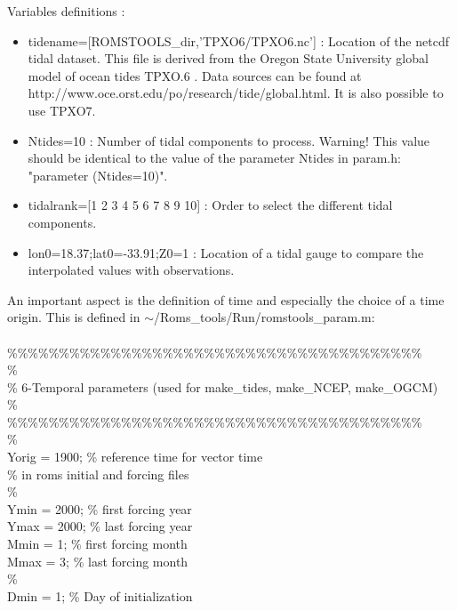 Variables definitions :
\begin{itemize}
\item tidename=[ROMSTOOLS\_dir,'TPXO6/TPXO6.nc'] : Location of the netcdf tidal dataset. 
This file is derived from the Oregon State University global model of ocean tides TPXO.6 
\citep{Egb02}.  Data sources can be found at \\
http://www.oce.orst.edu/po/research/tide/global.html.
It is also possible to use TPXO7.
\item Ntides=10 : Number of tidal components to process. Warning!
This value should be identical to the value of the parameter Ntides in param.h:
"parameter (Ntides=10)".
\item tidalrank=[1 2 3 4 5 6 7 8 9 10] : Order to select the different tidal components.
\item lon0=18.37;lat0=-33.91;Z0=1 : Location of a tidal gauge to compare the interpolated values
with observations. \\
\end{itemize}
An important aspect is the definition of time and especially the choice of a 
time origin. This is defined in $\sim$/Roms\_tools/Run/romstools\_param.m:
\\
\\
\%\%\%\%\%\%\%\%\%\%\%\%\%\%\%\%\%\%\%\%\%\%\%\%\%\%\%\%\%\%\%\%\%\%\%\%\%\%\%\%\\
\%\\
\% 6-Temporal parameters (used for make\_tides, make\_NCEP, make\_OGCM)\\
\%\\
\%\%\%\%\%\%\%\%\%\%\%\%\%\%\%\%\%\%\%\%\%\%\%\%\%\%\%\%\%\%\%\%\%\%\%\%\%\%\%\%\\
\%\\
Yorig         = 1900;               \% reference time for vector time\\
                                    \% in roms initial and forcing files\\
\%\\
Ymin          = 2000;               \% first forcing year\\
Ymax          = 2000;               \% last  forcing year\\
Mmin          = 1;                  \% first forcing month\\
Mmax          = 3;                  \% last  forcing month\\
\%\\
Dmin          = 1;                  \% Day of initialization\\
